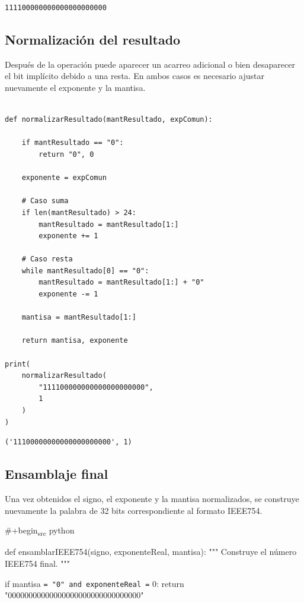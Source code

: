 \documentclass[11pt]{article}
\begin{document}
\begin{verbatim}
111100000000000000000000
\end{verbatim}

\subsection{Normalización del resultado}
\label{sec:org920b861}

Después de la operación puede aparecer un acarreo adicional o bien
desaparecer el bit implícito debido a una resta. En ambos casos es
necesario ajustar nuevamente el exponente y la mantisa.

\begin{verbatim}

def normalizarResultado(mantResultado, expComun):

    if mantResultado == "0":
        return "0", 0

    exponente = expComun

    # Caso suma
    if len(mantResultado) > 24:
        mantResultado = mantResultado[1:]
        exponente += 1

    # Caso resta
    while mantResultado[0] == "0":
        mantResultado = mantResultado[1:] + "0"
        exponente -= 1

    mantisa = mantResultado[1:]

    return mantisa, exponente

print(
    normalizarResultado(
        "111100000000000000000000",
        1
    )
)

\end{verbatim}

\begin{verbatim}
('11100000000000000000000', 1)
\end{verbatim}

\subsection{Ensamblaje final}
\label{sec:orgc18e6fe}

Una vez obtenidos el signo, el exponente y la mantisa normalizados,
se construye nuevamente la palabra de 32 bits correspondiente al
formato IEEE754.

\#+begin\textsubscript{src} python

def ensamblarIEEE754(signo, exponenteReal, mantisa):
    """
    Construye el número IEEE754 final.
    """

if mantisa \texttt{= "0" and exponenteReal =} 0:
    return "00000000000000000000000000000000"
\end{document}
